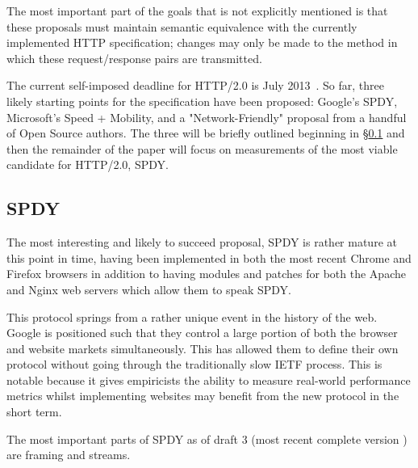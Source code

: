 \documentclass[11pt,letterpaper,notitlepage]{article}
\begin{document}
The most important part of the goals that is not explicitly mentioned is that
these proposals must maintain semantic equivalence with the currently
implemented HTTP specification; changes may only be made to the method in
which these request/response pairs are transmitted.

The current self-imposed deadline for HTTP/2.0 is July
2013~\cite{httpbis-charter}.  So far, three likely starting points for
the specification have been proposed: Google's SPDY, Microsoft's Speed +
Mobility, and a "Network-Friendly" proposal from a handful of Open Source
authors. The three will be briefly outlined beginning in
\S\ref{sec:background/spdy} and then the remainder of the paper will focus on
measurements of the most viable candidate for HTTP/2.0, SPDY.

\subsection{SPDY}
\label{sec:background/spdy}
The most interesting and likely to succeed proposal, SPDY is rather mature
at this point in time, having been implemented in both the most recent Chrome
and Firefox browsers in addition to having modules and patches for both the
Apache and Nginx web servers which allow them to speak SPDY.

This protocol springs from a rather unique event in the history of the web.
Google is positioned such that they control a large portion of both the browser
and website markets simultaneously. This has allowed them to define their own
protocol without going through the traditionally slow IETF process. This is
notable because it gives empiricists the ability to measure real-world
performance metrics whilst implementing websites may benefit from the new
protocol in the short term.

The most important parts of SPDY as of draft 3 (most recent complete version
\cite{spdy3}) are framing and streams.
\end{document}
